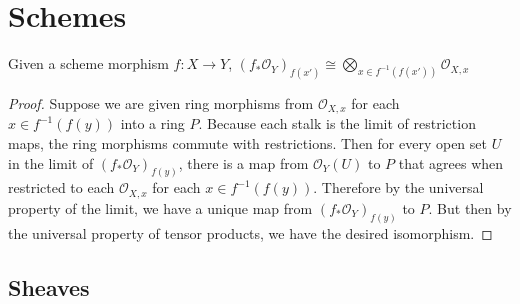 \section{Schemes}
\setcounter{section}{2}

\begin{lem}\label{lem:directimagestalks}
	Given a scheme morphism $f: X\to Y $, $(f_\ast \mathcal{O}_Y)_{f(x')} \cong \bigotimes_{x \in f^{-1}(f(x'))} \mathcal{O}_{X,x} $
\end{lem}
\begin{proof}
	Suppose we are given ring morphisms from $\mathcal{O}_{X,x} $ for each $x \in f^{-1}(f(y)) $ into a ring $P $.
	Because each stalk is the limit of restriction maps, the ring morphisms commute with restrictions.
	Then for every open set $U $ in the limit of $(f_\ast \mathcal{O}_Y)_{f(y)} $, there is a map from $\mathcal{O}_Y(U) $ to $P $ that agrees when restricted to each $\mathcal{O}_{X,x} $ for each $x \in f^{-1}(f(y))$.
	Therefore by the universal property of the limit, we have a unique map from $(f_\ast \mathcal{O}_Y)_{f(y)} $ to $P $.
	But then by the universal property of tensor products, we have the desired isomorphism.
\end{proof}

\subsection{Sheaves}

